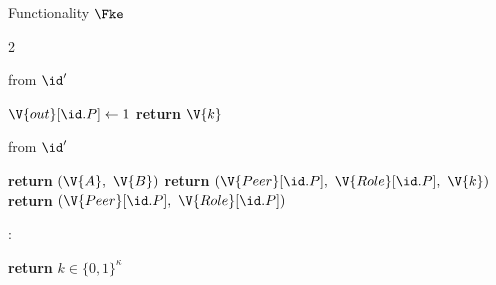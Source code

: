 \begin{interface}[nofloat]{Functionality $\Fke$ \\
\params{$\PID$, \quad $\Ps$, \quad $\admits$, \quad
$\uses := \{(\Adv,\serves)\}$, \quad $\pars := \kappa$}}
{\begin{multicols}{2}
\columnbreak

 \quad from $\id'$
\begin{algorithmic}[1]
\algcont
{}
\State $\V{out}[\id.P] \gets 1$ \label{ln:kesent}
\State \textbf{return} $\V{k}$ \label{ln:kedeliver}
\algsave
\end{algorithmic}
\vspace{1.4ex}

 \quad from $\id'$
\begin{algorithmic}[1]
\algcont
{}
  \State \textbf{return} $(\V{A},\ \V{B})$ \label{ln:keoutsider}
\EndIf
{}
  \State \textbf{return} $(\V{Peer}[\id.P],\ \V{Role}[\id.P],\ \V{k})$ \label{ln:kepfs}
\EndIf
\State \textbf{return} $(\V{Peer}[\id.P],\ \V{Role}[\id.P])$ \label{ln:keafter}
\algsave
\end{algorithmic}
\vspace{1.4ex}

:
\begin{algorithmic}[1]
\algcont
\State \textbf{return} $k \in \{0,1\}^{\kappa}$
\algsave
\end{algorithmic}
\end{multicols}}
\end{interface}
